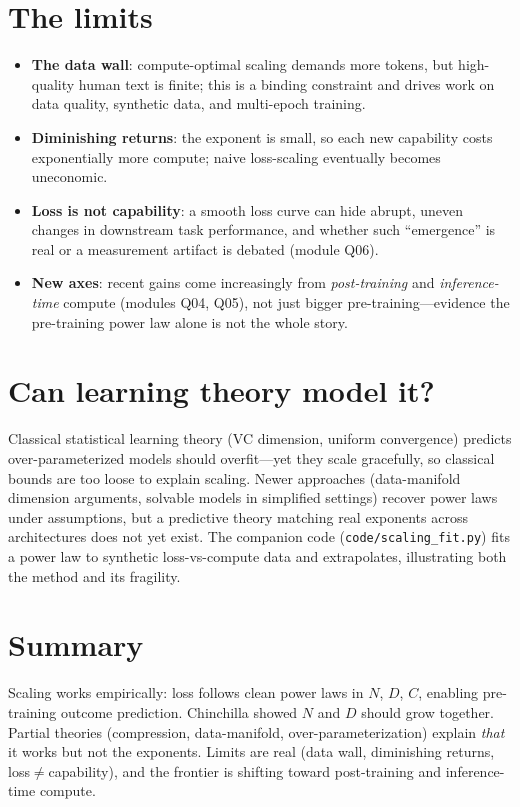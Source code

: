 \documentclass[11pt]{article}
\begin{document}
\section{The limits}
\begin{itemize}[leftmargin=1.4em]
\item \textbf{The data wall}: compute-optimal scaling demands more tokens, but high-quality human text is
finite; this is a binding constraint and drives work on data quality, synthetic data, and multi-epoch
training.
\item \textbf{Diminishing returns}: the exponent is small, so each new capability costs exponentially
more compute; naive loss-scaling eventually becomes uneconomic.
\item \textbf{Loss is not capability}: a smooth loss curve can hide abrupt, uneven changes in downstream
task performance, and whether such ``emergence'' is real or a measurement artifact is debated (module Q06).
\item \textbf{New axes}: recent gains come increasingly from \emph{post-training} and \emph{inference-time}
compute (modules Q04, Q05), not just bigger pre-training---evidence the pre-training power law alone is
not the whole story.
\end{itemize}

\section{Can learning theory model it?}
Classical statistical learning theory (VC dimension, uniform convergence) predicts over-parameterized
models should overfit---yet they scale gracefully, so classical bounds are too loose to explain scaling.
Newer approaches (data-manifold dimension arguments, solvable models in simplified settings) recover
power laws under assumptions, but a predictive theory matching real exponents across architectures does
not yet exist. The companion code (\texttt{code/scaling\_fit.py}) fits a power law to synthetic
loss-vs-compute data and extrapolates, illustrating both the method and its fragility.

\section{Summary}
Scaling works empirically: loss follows clean power laws in $N$, $D$, $C$, enabling pre-training outcome
prediction. Chinchilla showed $N$ and $D$ should grow together. Partial theories (compression,
data-manifold, over-parameterization) explain \emph{that} it works but not the exponents. Limits are real
(data wall, diminishing returns, loss$\ne$capability), and the frontier is shifting toward post-training
and inference-time compute.



\end{document}
